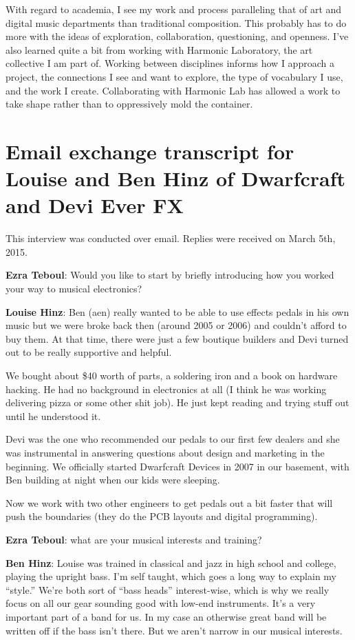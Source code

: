 With regard to academia, I see my work and process paralleling that of art and digital
music departments than traditional composition. This probably has to do more with the
ideas of exploration, collaboration, questioning, and openness. I've also learned quite
a bit from working with Harmonic Laboratory, the art collective I am part of. Working
between disciplines informs how I approach a project, the connections I see and want to
explore, the type of vocabulary I use, and the work I create. Collaborating with
Harmonic Lab has allowed a work to take shape rather than to oppressively mold the
container.

\section{Email exchange transcript for Louise and Ben Hinz of Dwarfcraft and Devi Ever FX}

This interview was conducted over email. Replies were received on March 5th, 2015. 

\textbf{Ezra Teboul}: Would you like to start by briefly introducing how you worked your way to musical electronics?

\textbf{Louise Hinz}: Ben (aen) really wanted to be
able to use effects pedals in his own music but we were broke back
then (around 2005 or 2006) and couldn't afford to buy them. At that
time, there were just a few boutique builders and Devi turned out to
be really supportive and helpful.

We bought about \$40 worth of parts, a soldering iron and a book on
hardware hacking.  He had no background in electronics at all (I think
he was working delivering pizza or some other shit job).  He just kept
reading and trying stuff out until he understood it.

Devi was the one who recommended our pedals to our first few dealers
and she was instrumental in answering questions about design and
marketing in the beginning.  We officially started Dwarfcraft Devices
in 2007 in our basement, with Ben building at night when our kids were
sleeping.

Now we work with two other engineers to get pedals out a bit faster
that will push the boundaries (they do the PCB layouts and digital
programming).

\textbf{Ezra Teboul}: what are your musical interests and training? 

\textbf{Ben Hinz}: Louise was trained in classical and jazz in high school and college, playing
the upright bass. I'm self taught, which goes a long way to explain my ``style.'' 
We're both sort of ``bass heads'' interest-wise, which is why we really focus on all our gear sounding good with low-end instruments. It's a very important part of a band for us. In my case an otherwise great band will be written off if the bass isn’t there. But we aren’t narrow in our musical interests.

